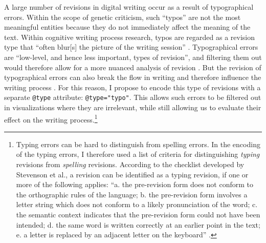\begin{paper}
A large number of revisions in digital writing occur as a result of
typographical errors. Within the scope of genetic criticism, such
``typos'' are not the most meaningful entities because they do not
immediately affect the meaning of the text. Within cognitive writing
process research, typos are regarded as a revision type that ``often blur{[}s{]}
the picture of the writing session'' \citep[68]{kollberg_s-notation_1998}. Typographical
errors are ``low-level, and hence less important, types of revision'', and
filtering them out would therefore allow for a more nuanced analysis of
revision \citep[71]{conijn_how_2019}. But the revision of typographical
errors can also break the flow in writing and therefore influence the
writing process \citep[72]{conijn_how_2019}. For this reason, I propose to encode
this type of revisions with a separate \lstinline[language=XML]!@type! attribute: \lstinline[language=XML]!@type="typo"!.
This allows such errors to be filtered out in visualizations where they
are irrelevant, while still allowing us to evaluate their effect on the
writing process.\footnote{Typing errors can be hard to distinguish from
  spelling errors. In the encoding of the typing errors, I therefore
  used a list of criteria \citep[developed by][]{stevenson_revising_2006} for
  distinguishing \emph{typing} revisions from \emph{spelling}
  revisions. According to the checklist developed by Stevenson et
  al., a revision can be identified as a typing revision, if one or more
  of the following applies: ``a. the pre-revision form does not conform
  to the orthographic rules of the language; b. the pre-revision form
  involves a letter string which does not conform to a likely
  pronunciation of the word; c. the semantic context indicates that the
  pre-revision form could not have been intended; d. the same word is
  written correctly at an earlier point in the text; e. a letter is
  replaced by an adjacent letter on the keyboard'' \citep[232]{stevenson_revising_2006}.}


\end{paper}
